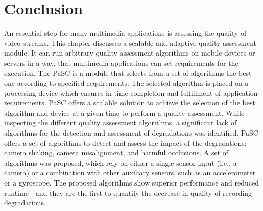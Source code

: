 \section{Conclusion}
\label{sec:557_Conclusion}
An essential step for many multimedia applications is assessing the quality of video streams.
This chapter discusses a scalable and adaptive quality assessment module. 
It can run arbitrary quality assessment algorithms on mobile devices or servers in a way, that multimedia applications can set requirements for the execution.
The \ac{PaSC} is a module that selects from a set of algorithms the best one according to specified requirements.
The selected algorithm is placed on a processing device which ensures in-time completion and fulfillment of application requirements.
\ac{PaSC} offers a scalable solution to achieve the selection of the best algorithm and device at a given time to perform a quality assessment.
While inspecting the different quality assessment algorithms, a significant lack of algorithms for the detection and assessment of degradations was identified.
\ac{PaSC} offers a set of algorithms to detect and assess the impact of the degradations: camera shaking, camera misalignment, and harmful occlusions.
A set of algorithms was proposed, which rely on either a single sensor input (i.e., a camera) or a combination with other auxiliary sensors, such as an accelerometer or a gyroscope. The proposed algorithms show superior performance and reduced runtime - and they are the first to quantify the decrease in quality of recording degradations. 
